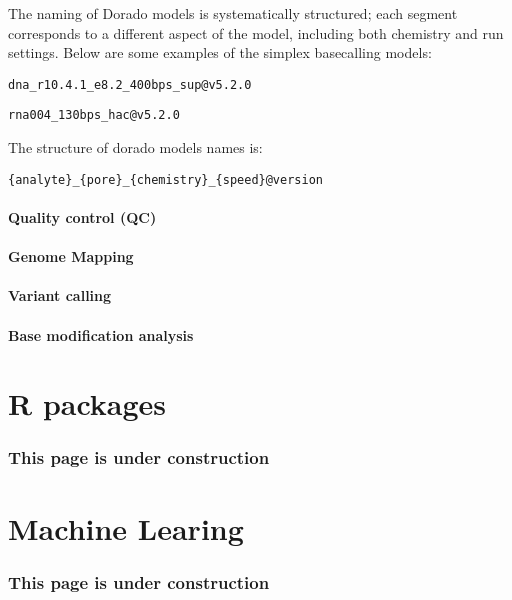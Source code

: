 \documentclass[
  letterpaper,
  DIV=11,
  numbers=noendperiod]{scrreprt}
\begin{document}
The naming of Dorado models is systematically structured; each segment
corresponds to a different aspect of the model, including both chemistry
and run settings. Below are some examples of the simplex basecalling
models:

\texttt{dna\_r10.4.1\_e8.2\_400bps\_sup@v5.2.0}

\texttt{rna004\_130bps\_hac@v5.2.0}

The structure of dorado models names is:

\texttt{\{analyte\}\_\{pore\}\_\{chemistry\}\_\{speed\}@version}

\subsection{Quality control (QC)}\label{quality-control-qc}

\subsection{Genome Mapping}\label{genome-mapping}

\subsection{Variant calling}\label{variant-calling}

\subsection{Base modification
analysis}\label{base-modification-analysis}

\part{R packages}

\section*{This page is under
construction}\label{this-page-is-under-construction-1}


\part{Machine Learing}

\section*{This page is under
construction}\label{this-page-is-under-construction-2}
\end{document}
